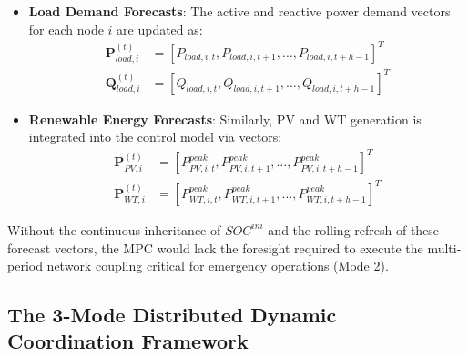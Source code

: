 \begin{itemize}
    \item \textbf{Load Demand Forecasts}: The active and reactive power demand vectors for each node $i$ are updated as:
    \begin{align}
        \mathbf{P}_{load,i}^{(t)} &= \left[ P_{load,i,t}, P_{load,i,t+1}, \dots, P_{load,i,t+h-1} \right]^T \label{eq:forecast_Pload} \\
        \mathbf{Q}_{load,i}^{(t)} &= \left[ Q_{load,i,t}, Q_{load,i,t+1}, \dots, Q_{load,i,t+h-1} \right]^T \label{eq:forecast_Qload}
    \end{align}
    \item \textbf{Renewable Energy Forecasts}: Similarly, PV and WT generation is integrated into the control model via vectors:
    \begin{align}
        \mathbf{P}_{PV,i}^{(t)} &= \left[ P_{PV,i,t}^{peak}, P_{PV,i,t+1}^{peak}, \dots, P_{PV,i,t+h-1}^{peak} \right]^T \label{eq:forecast_P_PV} \\
        \mathbf{P}_{WT,i}^{(t)} &= \left[ P_{WT,i,t}^{peak}, P_{WT,i,t+1}^{peak}, \dots, P_{WT,i,t+h-1}^{peak} \right]^T \label{eq:forecast_P_WT}
    \end{align}
\end{itemize}

Without the continuous inheritance of $SOC^{ini}$ and the rolling refresh of these forecast vectors, the MPC would lack the foresight required to execute the multi-period network coupling critical for emergency operations (Mode 2).

\subsection{The 3-Mode Distributed Dynamic Coordination Framework}

